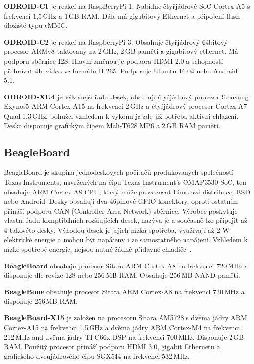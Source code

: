 	\textbf{ODROID-C1} je reakcí na RaspBerryPi 1. Nabídne čtyřjádrové SoC Cortex A5 s frekvencí 1,5\,GHz a 1\,GB RAM. Dále má gigabitový Ethernet a připojení flash úložiště typu eMMC. 

	\textbf{ODROID-C2} je reakcí na RaspberryPi 3. Obsahuje čtyřjádrový 64bitový procesor ARMv8 taktovaný na 2\,GHz, 2\,GB paměti a gigabitový ethernet. Má podporu sběrnice I2S. Hlavní změnou je podpora HDMI 2.0 a schopností přehrávat 4K video ve formátu H.265. Podporuje Ubuntu 16.04 nebo Android 5.1. 
	
	\textbf{ODROID-XU4} je výkonejší řada desek, obsahují čtyřjádrový procesor Samsung Exynos5 ARM Cortex-A15 na frekvenci 2\,GHz a čtyřjádrový procesor Cortex-A7 Quad 1.3\,GHz, bohužel vzhledem k výkonu je zde již potřeba aktivní chlazení. Deska disponuje grafickým čipem Mali-T628 MP6 a 2\,GB RAM paměti.

	
\subsection{BeagleBoard }
BeagleBoard je skupina jednodeskových počítačů produkovaných společností Texas Instruments, navržených na čipu Texas Instrument's OMAP3530 SoC, ten obsahuje ARM Cortex-A8 CPU, který může provozovat Linuxové distribuce, BSD nebo Android. Desky obsahují dva 46pinové GPIO konektory, oproti ostatním přináší podporu CAN (Controller Area Network) sběrnice. Výrobce poskytuje vlastní řadu komptibilních rozšiujících desek, nazýva je  a současně lze připojit až 4 takovéto desky. Výhodou desek je jejich nízká spotřeba, využívají až 2 W elektrické energie a mohou být napájeny i ze samostatného napájení. Vzhledem k nízké spotřebě energie, nejsou nutné žádné přídavné chladiče~\cite{BeagleBone}.

\textbf{BeagleBoard} obsahuje procesor Sitara ARM Cortex-A8 na frekvenci 720\,MHz a disponuje dle revize 128 nebo 256\,MB RAM. Obsahuje 256\,MB NAND paměti.

\textbf{BeagleBone} obsahuje procesor Sitara ARM Cortex-A8 na frekvenci 720\,MHz a disponuje 256\,MB RAM.

\textbf{BeagleBoard-X15} je založen na procesoru Sitara AM5728 s dvěma jádry ARM Cortex-A15 na frekvenci 1,5\,GHz a dvěma jádry ARM Cortex-M4 na frekvenci 212\,MHz and dvěma jádry TI C66x DSP na frekvenci 700\,MHz. Disponuje 2\,GB RAM. Použitý procesor přináší podporu HDMI 3.0, gigabit Ethernetu a grafického dvoujádrového čipu SGX544 na frekvenci 532\,MHz. 

